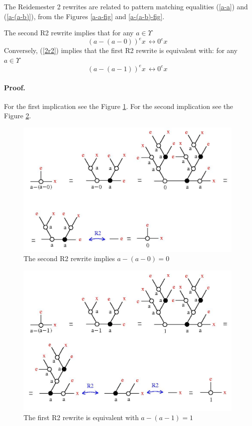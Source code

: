 The Reidemester 2 rewrites are related to pattern matching equalities (\ref{a-a}) and (\ref{a-(a-b)}),  from the Figures \ref{a-a-fig} and \ref{a-(a-b)-fig}.  

\begin{proposition}
The second R2 rewrite implies that for any $a \in \Upsilon$
\begin{equation} 
 (a - (a - 0))^{e} x \, \longleftrightarrow 0^{e} x 
\label{2r2}
\end{equation}
Conversely, (\ref{2r2}) implies that the first R2 rewrite is equivalent with: for any $a \in \Upsilon$
\begin{equation} 
 (a - (a - 1))^{e} x \, \longleftrightarrow 0^{e} x 
\label{1r2}
\end{equation}
\label{pr2}
\end{proposition}





\paragraph{Proof.} For the first implication see the Figure \ref{a-a-0r2-fig}. For the second implication see the Figure \ref{a-a-1r2-fig}. 
\begin{figure}[h]\centerline{\includegraphics[width=120mm]{jpg/a-a-0r2.jpg}}  \caption{ The second R2 rewrite implies $a-(a-0) = 0$ } \label{a-a-0r2-fig} \end{figure}

\begin{figure}[h]\centerline{\includegraphics[width=120mm]{jpg/a-a-1r2.jpg}}  \caption{ The first R2 rewrite is equivalent with $a-(a-1) = 1$ } \label{a-a-1r2-fig} \end{figure}

\vspace{.5cm}

